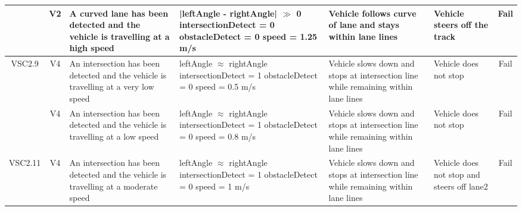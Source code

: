 \documentclass [10pt]{article}
\begin{document}
\begin{longtable}{ | p{ } | p{ } |  p{ } |  p{ } | p{ } | p{ } |  p{ } |}
   
    
    \rowcolor{tableCell}\multicolumn{1}{|c|}{VSC2.8} 
    & \multicolumn{1}{c|}{V2}
    & A curved lane has been detected and the vehicle is travelling at a high speed
     & |leftAngle - rightAngle| $\gg$ 0 \newline
    intersectionDetect = 0 \newline
    obstacleDetect = 0 \newline
    speed = 1.25 m/s
    & Vehicle follows curve of lane and stays within lane lines
    & Vehicle steers off the track 
    & \multicolumn{1}{c|}{Fail}\\ \hline
    
    \multicolumn{1}{|c|}{VSC2.9} 
    & \multicolumn{1}{c|}{V4}
    & An intersection has been detected and the vehicle is travelling at a very low speed
    & leftAngle $\approx$ rightAngle \newline
    intersectionDetect = 1 \newline
    obstacleDetect = 0 \newline
    speed = 0.5 m/s
    & Vehicle slows down and stops at intersection line while remaining within lane lines
    & Vehicle does not stop
    & \multicolumn{1}{c|}{Fail}\\ \hline
    
    \rowcolor{tableCell}\multicolumn{1}{|c|}{VSC2.10} 
    & \multicolumn{1}{c|}{V4}
    & An intersection has been detected and the vehicle is travelling at a low speed
    & leftAngle $\approx$ rightAngle \newline
    intersectionDetect = 1 \newline
    obstacleDetect = 0 \newline
    speed = 0.8 m/s
    & Vehicle slows down and stops at intersection line while remaining within lane lines
    & Vehicle does not stop
    & \multicolumn{1}{c|}{Fail}\\ \hline
    
    \multicolumn{1}{|c|}{VSC2.11} 
    & \multicolumn{1}{c|}{V4}
    & An intersection has been detected and the vehicle is travelling at a moderate speed
    & leftAngle $\approx$ rightAngle \newline
    intersectionDetect = 1 \newline
    obstacleDetect = 0 \newline
    speed = 1 m/s
    & Vehicle slows down and stops at intersection line while remaining within lane lines
    & Vehicle does not stop and steers off lane2
    & \multicolumn{1}{c|}{Fail}\\\hline
    

\end{longtable}
\end{document}
